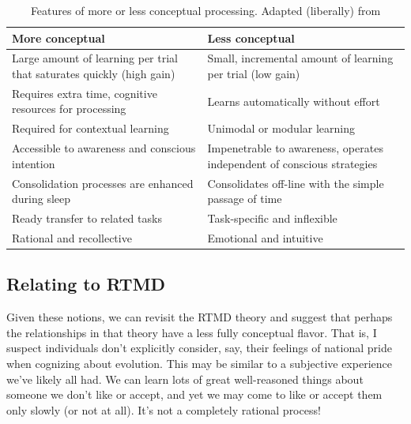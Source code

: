 \begin{table}
\centering
\begin{tabular}{p{}p{}}
\textbf{More conceptual} & \textbf{Less conceptual} \\ \hline \hline

Large amount of learning per trial that saturates quickly (high gain) &
Small, incremental amount of learning per trial (low gain) \\
\hline

Requires extra time, cognitive resources for processing &
Learns automatically without effort \\
\hline

Required for contextual learning &
Unimodal or modular learning \\
\hline

Accessible to awareness and conscious intention &
Impenetrable to awareness, operates independent of conscious strategies \\
\hline

Consolidation processes are enhanced during sleep &
Consolidates off-line with the simple passage of time \\
\hline

Ready transfer to related tasks &
Task-specific and inflexible \\
\hline

Rational and recollective &
Emotional and intuitive \\
\hline
\end{tabular}
\caption{Features of more or less conceptual processing. Adapted (liberally) from
\protect \citeauthor{clark_multiple_2010}} 
\label{table:multiple}
\end{table}

\subsection{Relating to RTMD}

Given these notions, we can revisit the RTMD theory and suggest that perhaps the
relationships in that theory have a less fully conceptual flavor.  That is, I
suspect individuals don't explicitly consider, say, their feelings of national
pride when cognizing about evolution.  This may be similar to a subjective
experience we've likely all had. We can learn lots of great well-reasoned things
about someone we don't like or accept, and yet we may come to like or accept
them only slowly (or not at all). It's not a completely rational process!

